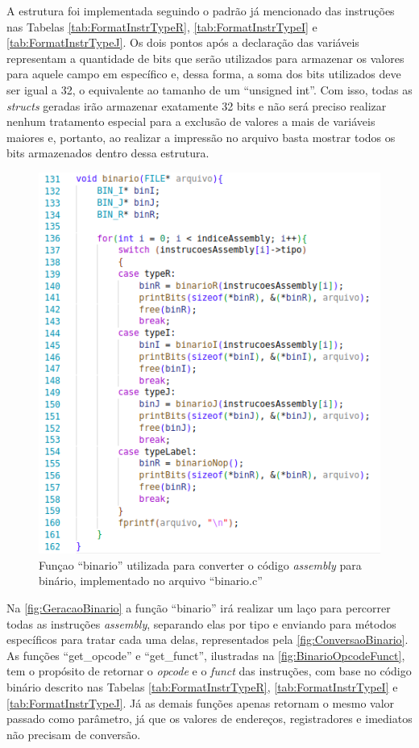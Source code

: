 \documentclass[
	12pt,				%
	oneside,
	a4paper,			%
	english,			%
	french,				%
	spanish,			%
	brazil,				%
	]{abntex2}
\begin{document}
A estrutura foi implementada seguindo o padrão já mencionado das instruções nas Tabelas \ref{tab:FormatInstrTypeR}, \ref{tab:FormatInstrTypeI} e \ref{tab:FormatInstrTypeJ}. Os dois pontos após a declaração das variáveis representam a quantidade de bits que serão utilizados para armazenar os valores para aquele campo em específico e, dessa forma, a soma dos bits utilizados deve ser igual a 32, o equivalente ao tamanho de um ``unsigned int''. Com isso, todas as \emph{structs} geradas irão armazenar exatamente 32 bits e não será preciso realizar nenhum tratamento especial para a exclusão de valores a mais de variáveis maiores e, portanto, ao realizar a impressão no arquivo basta mostrar todos os bits armazenados dentro dessa estrutura.

\begin{figure}[htbp]
\centering 
\caption{Funçao ``binario'' utilizada para converter o código \emph{assembly} para binário, implementado no arquivo \nohyphens{``binario.c''}} 
\label{fig:GeracaoBinario}
\graphicspath{ {./imgs/} } 
\includegraphics[scale=0.5]{imgs/Codigo/Binario_Geracao.png}
\end{figure}

Na \autoref{fig:GeracaoBinario} a função ``binario'' irá realizar um laço para percorrer todas as instruções \emph{assembly}, separando elas por tipo e enviando para métodos específicos para tratar cada uma delas, representados pela \autoref{fig:ConversaoBinario}. As funções ``get\_opcode'' e ``get\_funct'', ilustradas na \autoref{fig:BinarioOpcodeFunct}, tem o propósito de retornar o \emph{opcode} e o \emph{funct} das instruções, com base no código binário descrito nas Tabelas \ref{tab:FormatInstrTypeR}, \ref{tab:FormatInstrTypeI} e \ref{tab:FormatInstrTypeJ}. Já as demais funções apenas retornam o mesmo valor passado como parâmetro, já que os valores de endereços, registradores e imediatos não precisam de conversão.
\end{document}

